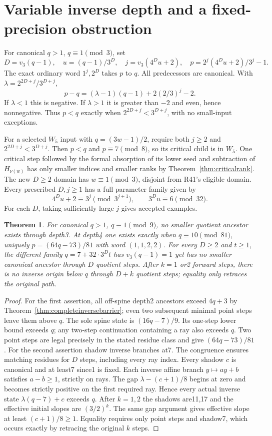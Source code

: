 \documentclass[11pt]{article}
\newtheorem{theorem}{Theorem}
\begin{document}
\section{Variable inverse depth and a fixed-precision obstruction}
For canonical $q>1$, $q\equiv1\pmod3$, set
\[
 D=v_3(q-1),\quad u=(q-1)/3^D,\quad j=v_3(4^Du+2),\quad
 p=2^j(4^Du+2)/3^j-1.
\]
The exact ordinary word $1^j,2^D$ takes $p$ to $q$. All predecessors
are canonical. With $\lambda=2^{2D+j}/3^{D+j}$,
\[
 p-q=(\lambda-1)(q-1)+2(2/3)^j-2.
\]
If $\lambda<1$ this is negative. If $\lambda>1$ it is greater than
$-2$ and even, hence nonnegative. Thus $p<q$ exactly when
$2^{2D+j}<3^{D+j}$, with no small-input exceptions.

For a selected $W_5$ input with $q=(3w-1)/2$, require both
$j\ge2$ and $2^{2D+j}<3^{D+j}$. Then $p<q$ and $p\equiv7\pmod8$,
so its critical child is in $W_5$.
One critical step followed by the formal absorption of its lower seed
and subtraction of $H_{\nu(w)}$ has only smaller indices and smaller
ranks by Theorem~\ref{thm:criticalrank}. The new $D\ge2$ domain has
$w\equiv1\pmod3$, disjoint from R41's eligible domain.
Every prescribed $D,j\ge1$ has a full parameter family given by
\[
 4^Du+2\equiv3^j\pmod{3^{j+1}},\qquad 3^Du\equiv6\pmod{32}.
\]
For each $D$, taking sufficiently large $j$ gives accepted examples.

\begin{theorem}\label{thm:inverseescape}
For canonical $q>1$, $q\equiv1\pmod9$, no smaller quotient ancestor
exists through depth3. At depth4 one exists exactly when
$q\equiv10\pmod{81}$, uniquely $p=(64q-73)/81$ with word $(1,1,2,2)$.
For every $D\ge2$ and $t\ge1$, the different family
$q=7+32\cdot3^Dt$ has $v_3(q-1)=1$ yet has no smaller canonical ancestor
through $D$ quotient steps. After $k=1$ or2 forward steps, there is no
inverse origin below $q$ through $D+k$ quotient steps; equality only
retraces the original path.
\end{theorem}
\begin{proof}
For the first assertion, all off-spine depth2 ancestors exceed $4q+3$
by Theorem~\ref{thm:completeinversebarrier}; even two subsequent
minimal point steps leave them above $q$. The sole spine state is
$(16q-7)/9$. Its one-step lower bound exceeds $q$; any two-step
continuation containing a ray also exceeds $q$. Two point steps are
legal precisely in the stated residue class and give $(64q-73)/81$.
For the second assertion shadow inverse branches at7. The congruence
ensures matching residues for $D$ steps, including every ray index.
Every shadow $c$ is canonical and at least7 since1 is fixed.
Each inverse affine branch $y\mapsto ay+b$ satisfies $a-b\ge1$,
strictly on rays. The gap $\lambda-(c+1)/8$ begins at zero and becomes
strictly positive on the first required ray. Hence every actual inverse
state $\lambda(q-7)+c$ exceeds $q$.
After $k=1,2$ the shadows are11,17 and the effective initial slopes are
$(3/2)^k$. The same gap argument gives effective slope at least
$(c+1)/8\ge1$. Equality requires only point steps and shadow7,
which occurs exactly by retracing the original $k$ steps.
\end{proof}
\end{document}
